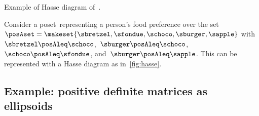 \vspace{1cm}
\begin{marginfigure}[4mm]
    \centering
    \caption{Example of Hasse diagram of~\posA.}
    \label{fig:hasse}
\end{marginfigure}
\begin{example}
    Consider a poset~\posA representing a person's food preference over the set~$\posAset=\makeset{\sbretzel,\sfondue,\schoco,\sburger,\sapple}$ with~$\sbretzel\posAleq \schoco$,~$\sburger\posAleq \schoco$,~$\schoco\posAleq \sfondue$, and~$\sburger\posAleq \sapple$.
    This can be represented with a Hasse diagram as in~\cref{fig:hasse}.
\end{example}

\vfill\clearpage

\subsection{Example: positive definite matrices as ellipsoids}

\begin{marginfigure}
    \centering

    \caption{}
    \label{fig:posdef}
\end{marginfigure}

